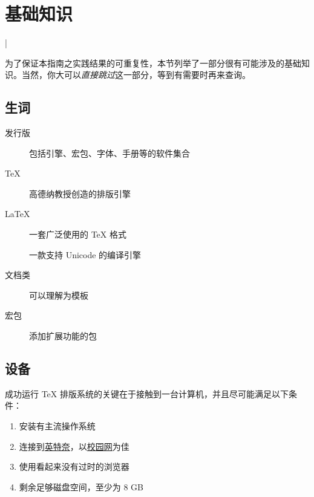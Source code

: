 \section{基础知识}
\label{sec:intro}

\lstMakeShortInline[
  style=style@base,
  columns=fixed]|

\begin{widepar}
为了保证本指南之实践结果的可重复性，本节列举了一部分很有可能涉及的基础知识。当然，你大可以\emph{直接跳过}这一部分，等到有需要时再来查询。
\end{widepar}

\subsection{生词}

\begin{description}
  \item[发行版] 包括引擎、宏包、字体、手册等的软件集合
  \item[\TeX{}] 高德纳教授创造的排版引擎
  \item[\LaTeX{}] 一套广泛使用的 \TeX{} 格式
  \item[] 一款支持 Unicode 的编译引擎
  \item[文档类] 可以理解为模板
  \item[宏包] 添加扩展功能的包
\end{description}

\subsection{设备}
\label{subsec:device}

成功运行 \TeX{} 排版系统的关键在于接触到一台计算机，并且尽可能满足以下条件：

\begin{enumerate}
  \item 安装有主流操作系统
  \item 连接到\href{https://www.bilibili.com/video/BV1vW411Y7oh}{英特奈}，以\href{https://p.nju.edu.cn}{校园网}为佳
  \item 使用看起来没有过时的浏览器
  \item 剩余足够磁盘空间，至少为 8 GB
\end{enumerate}

